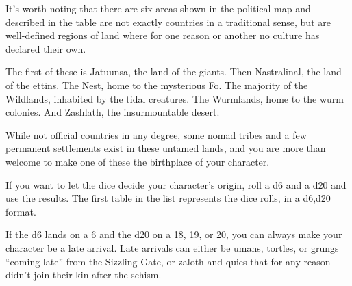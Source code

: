 It's worth noting that there are six areas shown in the political map and described in the table are not exactly countries in a traditional sense, but are well-defined regions of land where for one reason or another no culture has declared their own.

The first of these is Jatuunsa, the land of the giants.
Then Nastralinal, the land of the ettins.
The Nest, home to the mysterious Fo.
The majority of the Wildlands, inhabited by the tidal creatures.
The Wurmlands, home to the wurm colonies.
And Zashlath, the insurmountable desert.

While not official countries in any degree, some nomad tribes and a few permanent settlements exist in these untamed lands, and you are more than welcome to make one of these the birthplace of your character.

If you want to let the dice decide your character's origin, roll a d6 and a d20 and use the results.
The first table in the list represents the dice rolls, in a d6,d20 format.

If the d6 lands on a 6 and the d20 on a 18, 19, or 20, you can always make your character be a late arrival.
Late arrivals can either be umans, tortles, or grungs ``coming late'' from the Sizzling Gate, or zaloth and quies that for any reason didn't join their kin after the schism.


